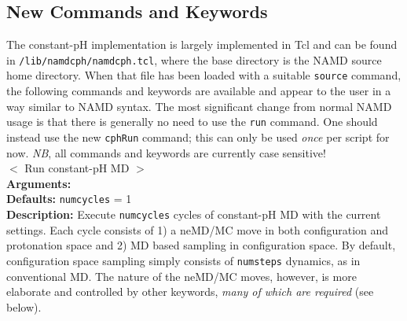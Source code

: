\newpage
\subsection{New Commands and Keywords}

The constant-pH implementation is largely implemented in Tcl and can be found
  in \texttt{/lib/namdcph/namdcph.tcl}, where the base directory is the NAMD
  source home directory.
When that file has been loaded with a suitable \texttt{source} command, the 
  following commands and keywords are available and appear to the user in a way
  similar to NAMD syntax.
The most significant change from normal NAMD usage is that there is generally
  no need to use the \texttt{run} command.
One should instead use the new \texttt{cphRun} command;
this can only be used \emph{once} per script for now.
\textit{NB}, all commands and keywords are currently case sensitive!
\\[11pt]
\noindent
{\tt {}} $<$ Run constant-pH MD $>$
\\
\textbf{Arguments:} { }
\\
\textbf{Defaults:} {{\tt numcycles} = 1}
\\
\textbf{Description:}
Execute {\tt numcycles} cycles of constant-pH MD with the current settings.
Each cycle consists of 1) a neMD/MC move in both configuration and protonation
  space and 2) MD based sampling in configuration space.
By default, configuration space sampling simply consists of {\tt numsteps}
  dynamics, as in conventional MD.
The nature of the neMD/MC moves, however, is more elaborate and controlled by
  other keywords, \emph{many of which are required} (see below).

